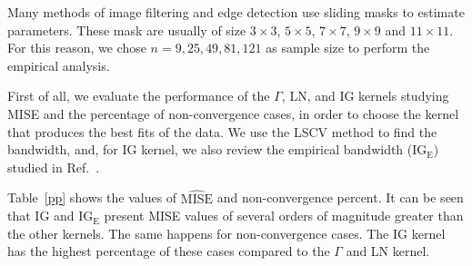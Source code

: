 \documentclass[twocolumn]{svjour3}
\begin{document}
Many methods of image filtering and edge detection use sliding masks to estimate parameters. 
These mask are usually of size $3 \times 3$, $5 \times 5$, $7 \times 7$, $9 \times 9$ and $11 \times 11$. 
For this reason, we chose $n=9,25,49,81,121$ as sample size to perform the empirical analysis.

%	
First of all, we evaluate the performance of the $\Gamma$, LN, and IG kernels studying MISE and the percentage of non-convergence cases, in order to choose the kernel that produces the best fits of the data. 
We use the LSCV method to find the bandwidth, and, for IG kernel, we also review the empirical bandwidth ($\text{IG}_{\text{E}}$) studied in Ref.~\cite{gambini2015}. 

Table~\ref{pp} shows the values of $\widehat{\text{MISE}}$ and non-convergence percent. 
It can be seen that IG and $\text{IG}_{\text{E}}$ present MISE values of several orders of magnitude greater than the other kernels. 
The same happens for non-convergence cases. 
The IG kernel has the highest percentage of these cases compared to the $\Gamma$ and LN kernel.
\end{document}
